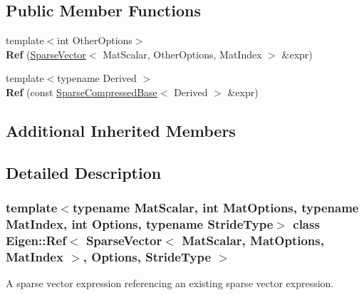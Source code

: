 \subsection*{Public Member Functions}
\begin{DoxyCompactItemize}
\item 
\mbox{\label{class_eigen_1_1_ref_3_01_sparse_vector_3_01_mat_scalar_00_01_mat_options_00_01_mat_index_01_4_00357b3c2eca55b7ce618d0a2b2447510f_ab072c18638de40af20105b82423b1c07}} 
{\footnotesize template$<$int Other\+Options$>$ }\\{\bfseries Ref} (\mbox{\hyperlink{class_eigen_1_1_sparse_vector}{Sparse\+Vector}}$<$ Mat\+Scalar, Other\+Options, Mat\+Index $>$ \&expr)
\item 
\mbox{\label{class_eigen_1_1_ref_3_01_sparse_vector_3_01_mat_scalar_00_01_mat_options_00_01_mat_index_01_4_00357b3c2eca55b7ce618d0a2b2447510f_a96ae29e954eba5a59520ae4f7c1588ab}} 
{\footnotesize template$<$typename Derived $>$ }\\{\bfseries Ref} (const \mbox{\hyperlink{class_eigen_1_1_sparse_compressed_base}{Sparse\+Compressed\+Base}}$<$ Derived $>$ \&expr)
\end{DoxyCompactItemize}
\subsection*{Additional Inherited Members}


\subsection{Detailed Description}
\subsubsection*{template$<$typename Mat\+Scalar, int Mat\+Options, typename Mat\+Index, int Options, typename Stride\+Type$>$\newline
class Eigen\+::\+Ref$<$ Sparse\+Vector$<$ Mat\+Scalar, Mat\+Options, Mat\+Index $>$, Options, Stride\+Type $>$}

A sparse vector expression referencing an existing sparse vector expression. 


